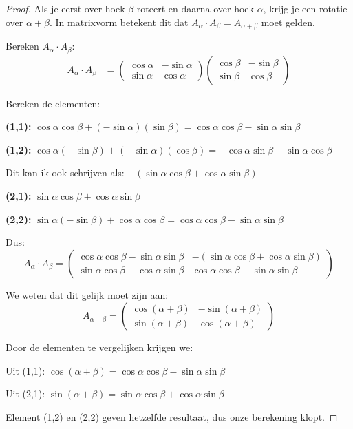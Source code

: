 \documentclass{article}
\begin{document}
\begin{proof}
    Als je eerst over hoek $\beta$ roteert en daarna over hoek $\alpha$, krijg je een rotatie over $\alpha + \beta$.
    In matrixvorm betekent dit dat $A_{\alpha} \cdot A_{\beta} = A_{\alpha+\beta}$ moet gelden.

    Bereken $A_{\alpha} \cdot A_{\beta}$:
    \begin{align*}
        A_{\alpha} \cdot A_{\beta} & =
        \begin{pmatrix} \cos \alpha & -\sin \alpha \\ \sin \alpha & \cos \alpha \end{pmatrix}
        \begin{pmatrix} \cos \beta & -\sin \beta \\ \sin \beta & \cos \beta \end{pmatrix}
    \end{align*}

    Bereken de elementen:

    \textbf{(1,1):} $\cos \alpha \cos \beta + (-\sin \alpha)(\sin \beta) = \cos \alpha \cos \beta - \sin \alpha \sin \beta$

    \textbf{(1,2):} $\cos \alpha (-\sin \beta) + (-\sin \alpha)(\cos \beta) = -\cos \alpha \sin \beta - \sin \alpha \cos \beta$

    Dit kan ik ook schrijven als: $-(\sin \alpha \cos \beta + \cos \alpha \sin \beta)$

    \textbf{(2,1):} $\sin \alpha \cos \beta + \cos \alpha \sin \beta$

    \textbf{(2,2):} $\sin \alpha(-\sin \beta) + \cos \alpha \cos \beta = \cos \alpha \cos \beta - \sin \alpha \sin \beta$

    Dus:
    \[ A_{\alpha} \cdot A_{\beta} =
        \begin{pmatrix}
            \cos \alpha \cos \beta - \sin \alpha \sin \beta & -(\sin \alpha \cos \beta + \cos \alpha \sin \beta) \\
            \sin \alpha \cos \beta + \cos \alpha \sin \beta & \cos \alpha \cos \beta - \sin \alpha \sin \beta
        \end{pmatrix} \]

    We weten dat dit gelijk moet zijn aan:
    \[ A_{\alpha + \beta} =
        \begin{pmatrix}
            \cos(\alpha + \beta) & -\sin(\alpha + \beta) \\
            \sin(\alpha + \beta) & \cos(\alpha + \beta)
        \end{pmatrix} \]

    Door de elementen te vergelijken krijgen we:

    Uit (1,1): $\boxed{\cos(\alpha + \beta) = \cos \alpha \cos \beta - \sin \alpha \sin \beta}$

    Uit (2,1): $\boxed{\sin(\alpha + \beta) = \sin \alpha \cos \beta + \cos \alpha \sin \beta}$

    \bigskip

    Element (1,2) en (2,2) geven hetzelfde resultaat, dus onze berekening klopt.

\end{proof}
\end{document}
